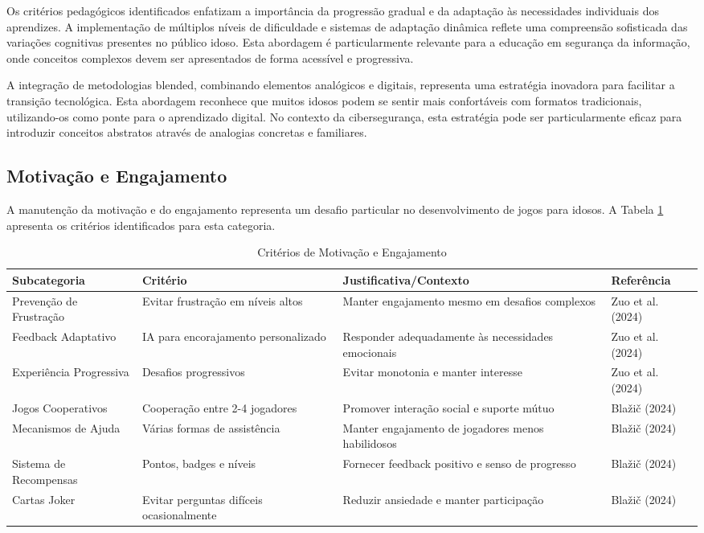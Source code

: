 Os critérios pedagógicos identificados enfatizam a importância da progressão gradual e da adaptação às necessidades individuais dos aprendizes. A implementação de múltiplos níveis de dificuldade e sistemas de adaptação dinâmica reflete uma compreensão sofisticada das variações cognitivas presentes no público idoso. Esta abordagem é particularmente relevante para a educação em segurança da informação, onde conceitos complexos devem ser apresentados de forma acessível e progressiva.

A integração de metodologias blended, combinando elementos analógicos e digitais, representa uma estratégia inovadora para facilitar a transição tecnológica. Esta abordagem reconhece que muitos idosos podem se sentir mais confortáveis com formatos tradicionais, utilizando-os como ponte para o aprendizado digital. No contexto da cibersegurança, esta estratégia pode ser particularmente eficaz para introduzir conceitos abstratos através de analogias concretas e familiares.

\subsection{Motivação e Engajamento}
\label{subsec:motivacao}

A manutenção da motivação e do engajamento representa um desafio particular no desenvolvimento de jogos para idosos. A Tabela \ref{tab:motivacao} apresenta os critérios identificados para esta categoria.

\begin{table}[H]
\centering
\caption{Critérios de Motivação e Engajamento}
\label{tab:motivacao}
\begin{tabular}{p{2.5cm}p{3cm}p{5cm}p{3cm}}
\hline
\textbf{Subcategoria} & \textbf{Critério} & \textbf{Justificativa/Contexto} & \textbf{Referência} \\ \hline
Prevenção de Frustração & Evitar frustração em níveis altos & Manter engajamento mesmo em desafios complexos & Zuo et al. (2024) \\
Feedback Adaptativo & IA para encorajamento personalizado & Responder adequadamente às necessidades emocionais & Zuo et al. (2024) \\
Experiência Progressiva & Desafios progressivos & Evitar monotonia e manter interesse & Zuo et al. (2024) \\
Jogos Cooperativos & Cooperação entre 2-4 jogadores & Promover interação social e suporte mútuo & Blažič (2024) \\
Mecanismos de Ajuda & Várias formas de assistência & Manter engajamento de jogadores menos habilidosos & Blažič (2024) \\
Sistema de Recompensas & Pontos, badges e níveis & Fornecer feedback positivo e senso de progresso & Blažič (2024) \\
Cartas Joker & Evitar perguntas difíceis ocasionalmente & Reduzir ansiedade e manter participação & Blažič (2024) \\
\hline
\end{tabular}
\end{table}

